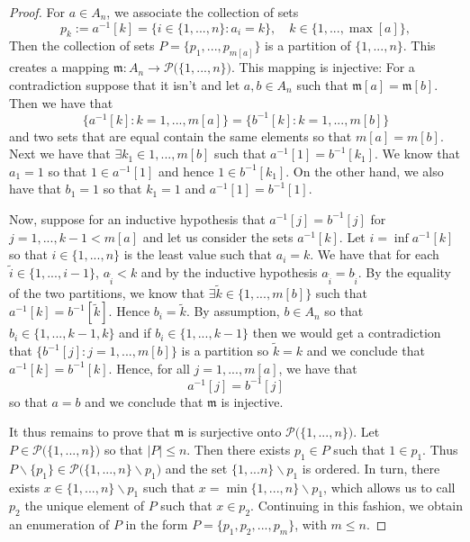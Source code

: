 \documentclass[a4paper,11pt,twoside]{article}
\numberwithin{equation}{section}
\theoremstyle{plain}
\newcommand{\scP}{\mathscr{P}}
\newcommand{\1}{\mathbbm{1}}
\begin{document}
	\begin{proof}
		For $a \in A_{n}$, we associate the collection of sets
		$$
		p_{k}:=a^{-1}[k] = \big\{i \in \{1, ..., n\} : a_{i} = k \big\}, \quad k \in \{1, ..., \max[a] \},
		$$
		Then the collection of sets $P = \big\{ p_{1}, ..., p_{m[a]} \big\}$ is a partition of $\{ 1, ..., n\}$. This creates a mapping $\mathfrak{m}: A_{n} \to \scP\big( \{1, ..., n\} \big)$. This mapping is injective: For a contradiction suppose that it isn't and let $a, b \in A_{n}$ such that $\mathfrak{m}[a]= \mathfrak{m}[b]$. Then we have that
		$$
		\big\{ a^{-1}[k] : k = 1, ..., m[a] \big\} = \big\{ b^{-1}[k] : k=1, ..., m[b] \big\}  
		$$
		and two sets that are equal contain the same elements so that $m[a] = m[b]$. Next we have that $\exists k_1 \in 1, ..., m[b]$ such that $a^{-1}[1] = b^{-1}[k_1]$. We know that $a_1 = 1$ so that $1\in a^{-1}[1]$ and hence $1\in b^{-1}[k_1]$. On the other hand, we also have that $b_1 = 1$ so that $k_1 = 1$ and $a^{-1}[1] = b^{-1}[1]$. 
		
		Now, suppose for an inductive hypothesis that $a^{-1}[j] = b^{-1}[j]$ for $j=1, ..., k-1<m[a]$ and let us consider the sets $a^{-1}[k]$. Let $i = \inf a^{-1}[k]$ so that $i\in \{1, ..., n\}$ is the least value such that $a_i = k$. We have that for each $\tilde{i} \in \{1, ..., i-1\}$, $a_{\tilde{i}} < k$ and by the inductive hypothesis $a_{\tilde{i}} = b_{\tilde{i}}$. By the equality of the two partitions, we know that $\exists \tilde{k}\in \{1, ..., m[b]\}$ such that $a^{-1}[k] = b^{-1}[\tilde{k}]$. Hence $b_i = \tilde{k}$. By assumption, $b\in A_n$ so that $b_i \in \{ 1, ..., k-1, k\}$ and if $b_i \in \{1, ..., k-1\}$ then we would get a contradiction that $\big\{ b^{-1}[j]: j=1, ..., m[b]\big\}$ is a partition so $\tilde{k} = k$ and we conclude that $a^{-1}[k] = b^{-1}[k]$. Hence, for all $j=1, ..., m[a]$, we have that 
		$$
		a^{-1}[j] = b^{-1}[j]
		$$
		so that $a = b$ and we conclude that $\mathfrak{m}$ is injective. 
		
		It thus remains to prove that $\mathfrak{m}$ is surjective onto $\scP\big( \{1,...,n\} \big)$. Let $P \in \scP\big( \{1,...,n\} \big)$ so that $|P| \leq n$. Then there exists $p_1 \in P$ such that $1 \in p_1$. Thus $P \backslash \{p_1\} \in \scP\big( \{1, ..., n\} \backslash p_1 \big)$ and the set $\{1, ... n\}\backslash p_1$ is ordered. In turn, there exists $x\in \{1, ..., n\} \backslash p_1$ such that $x = \min \{1, ..., n\} \backslash p_1$, which allows us to call $p_2$ the unique element of $P$ such that  $x\in p_{2}$. Continuing in this fashion, we obtain an enumeration of $P$ in the form $P= \{p_1, p_2, ...,p_{m} \}$, with $m \leq n$. 
		

\end{proof}
\end{document}
